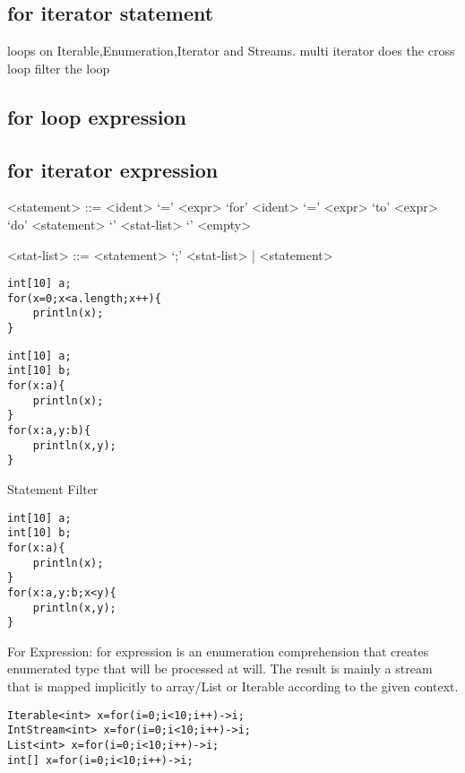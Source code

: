 \documentclass{tufte-book}
\begin{document}
            \subsection{for iterator statement}
             loops on Iterable,Enumeration,Iterator and Streams.
             multi iterator does the cross loop
             filter the loop
            \subsection{for loop expression}
            \subsection{for iterator expression}

            \begin{grammar}

            <statement> ::= <ident> `=' <expr> 
            \alt `for' <ident> `=' <expr> `to' <expr> `do' <statement> 
            \alt `{' <stat-list> `}' 
            \alt <empty> 

            <stat-list> ::= <statement> `;' <stat-list> | <statement> 

            \end{grammar}


            \begin{lstlisting}
int[10] a;
for(x=0;x<a.length;x++){
    println(x);
}
            \end{lstlisting}


            \begin{lstlisting}
int[10] a;
int[10] b;
for(x:a){
    println(x);
}
for(x:a,y:b){
    println(x,y);
}
            \end{lstlisting}

            Statement Filter
            \begin{lstlisting}
int[10] a;
int[10] b;
for(x:a){
    println(x);
}
for(x:a,y:b;x<y){
    println(x,y);
}
            \end{lstlisting}
            For Expression:
            for expression is an enumeration comprehension that creates enumerated type that will be processed 
            at will. The result is mainly a stream that is mapped implicitly to array/List or Iterable according 
            to the given context.
            \begin{lstlisting}
Iterable<int> x=for(i=0;i<10;i++)->i;
IntStream<int> x=for(i=0;i<10;i++)->i;
List<int> x=for(i=0;i<10;i++)->i;
int[] x=for(i=0;i<10;i++)->i;
            \end{lstlisting}
\end{document}
